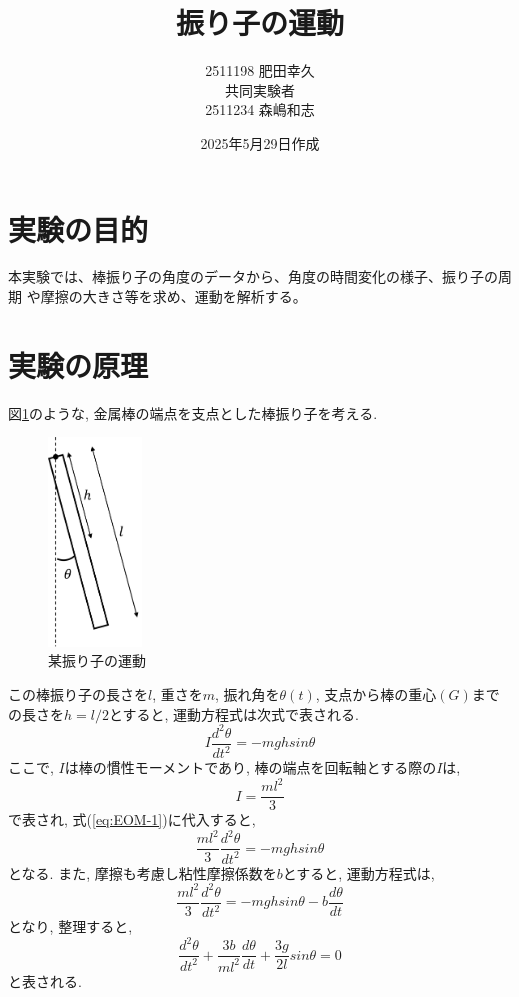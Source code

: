 \documentclass{jarticle}
\title{振り子の運動}
\author{2511198 肥田幸久 \\ 共同実験者 \\ 2511234 森嶋和志}
\date{2025年5月29日作成}
\begin{document}
\maketitle



\section{実験の目的}

本実験では、棒振り子の角度のデータから、角度の時間変化の様子、振り子の周期
や摩擦の大きさ等を求め、運動を解析する。



\section{実験の原理}

図\ref{fg:rod-pendulum}のような, 金属棒の端点を支点とした棒振り子を考える.

\begin{figure}[H]
  \begin{center}
    \includegraphics[width=25mm]{rod_pendulum_picture.png}
    \caption{某振り子の運動}
    \label{fg:rod-pendulum}
  \end{center}
\end{figure}

この棒振り子の長さを$l$, 重さを$m$, 振れ角を$\theta(t)$, 支点から棒の重心$(G)$までの長さを$h=l/2$とすると, 運動方程式は次式で表される.
\begin{equation}
  I\frac{d^2\theta}{dt^2}=-mghsin\theta
  \label{eq:EOM-1}
\end{equation}
ここで, $I$は棒の慣性モーメントであり, 棒の端点を回転軸とする際の$I$は,
\begin{equation}
  I=\frac{ml^2}{3}
  \label{eq:MOI}
\end{equation}
で表され, 式(\ref{eq:EOM-1})に代入すると,
\begin{equation}
  \frac{ml^2}{3}\frac{d^2\theta}{dt^2}=-mghsin\theta
  \label{eq:EOM-1.1}
\end{equation}
となる.
また, 摩擦も考慮し粘性摩擦係数を$b$とすると, 運動方程式は,
\begin{equation}
  \frac{ml^2}{3}\frac{d^2\theta}{dt^2}=-mghsin\theta-b\frac{d\theta}{dt}
  \label{eq:EOM-2}
\end{equation}
となり, 整理すると,
\begin{equation}
  \frac{d^2\theta}{dt^2}+\frac{3b}{ml^2}\frac{d\theta}{dt}+\frac{3g}{2l}sin\theta=0
  \label{eq:EOM-2.1}
\end{equation}
と表される.
\end{document}
